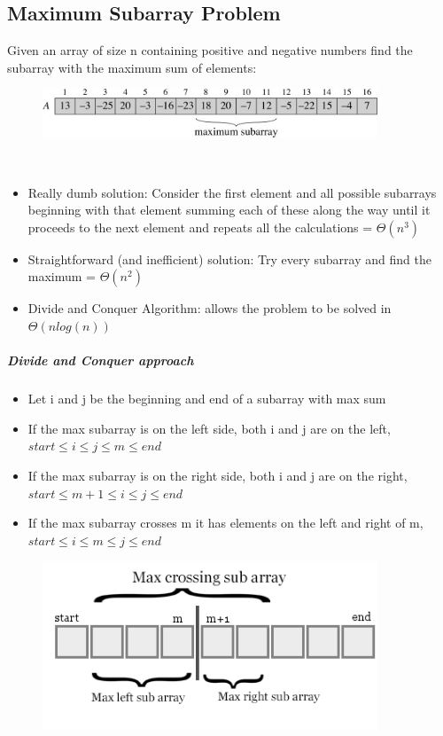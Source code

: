 \documentclass[12pt,letterpaper]{article}
\begin{document}
\subsection{Maximum Subarray Problem}
Given an array of size n containing positive and negative numbers find the subarray with the maximum sum of elements: \\
\begin{figure}[h]
\centering
\includegraphics[width=10cm]{maxsubarray}
\end{figure} \\
\begin{itemize}
\item Really dumb solution: Consider the first element and all possible subarrays beginning with that element summing each of these along the way until it proceeds to the next element and repeats all the calculations = $\Theta(n^3)$ 
\item Straightforward (and inefficient) solution: Try every subarray and find the maximum = $\Theta(n^2)$
\item Divide and Conquer Algorithm: allows the problem to be solved in $\Theta(nlog(n))$
\end{itemize}
\subparagraph{Divide and Conquer approach}
\begin{itemize}
\item Let i and j be the beginning and end of a subarray with max sum
\item If the max subarray is on the left side, both i and j are on the left, $ start \leq i \leq j \leq m \leq end $
\item If the max subarray is on the right side, both i and j are on the right, $ start \leq m+1 \leq i \leq j \leq end $
\item If the max subarray crosses m it has elements on the left and right of m, $ start \leq i \leq m \leq j \leq end $
\end{itemize}
\begin{figure}[h]
\centering
\includegraphics[width=10cm]{maxcrosssubarraysme}
\end{figure}
\end{document}
